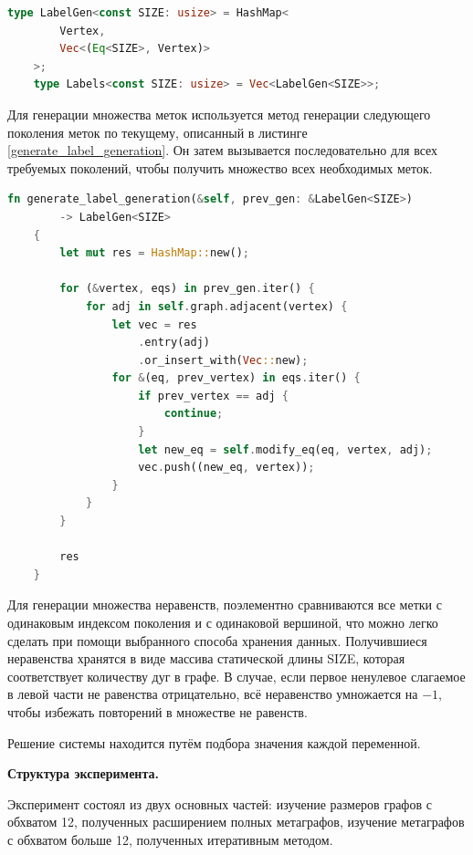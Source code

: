 \documentclass[14pt]{mmcs-article}
\begin{document}
\begin{lstlisting}[language=Rust, caption={ Метод генерации одного поколения меток. }, label=types] 
    type LabelGen<const SIZE: usize> = HashMap<
        Vertex,
        Vec<(Eq<SIZE>, Vertex)>
    >;
    type Labels<const SIZE: usize> = Vec<LabelGen<SIZE>>;
\end{lstlisting}

Для генерации множества меток используется метод генерации следующего поколения меток по текущему, описанный в листинге \ref{generate_label_generation}. Он затем вызывается последовательно для всех требуемых поколений, чтобы получить множество всех необходимых меток. 

\begin{lstlisting}[language=Rust, caption={ Метод генерации одного поколения меток. }, label=generate_label_generation]
    fn generate_label_generation(&self, prev_gen: &LabelGen<SIZE>)
        -> LabelGen<SIZE>
    {
        let mut res = HashMap::new();

        for (&vertex, eqs) in prev_gen.iter() {
            for adj in self.graph.adjacent(vertex) {
                let vec = res
                    .entry(adj)
                    .or_insert_with(Vec::new);
                for &(eq, prev_vertex) in eqs.iter() {
                    if prev_vertex == adj {
                        continue;
                    }
                    let new_eq = self.modify_eq(eq, vertex, adj);
                    vec.push((new_eq, vertex));
                }
            }
        }

        res
    }
\end{lstlisting}

Для генерации множества неравенств, поэлементно сравниваются все метки с одинаковым индексом поколения и с одинаковой вершиной, что можно легко сделать при помощи выбранного способа хранения данных. Получившиеся неравенства хранятся в виде массива статической длины SIZE, которая соответствует количеству дуг в графе. В случае, если первое ненулевое слагаемое в левой части не равенства отрицательно, всё неравенство умножается на $-1$, чтобы избежать повторений в множестве не равенств.

Решение системы находится путём подбора значения каждой переменной.

\textbf{Структура эксперимента.} 

Эксперимент состоял из двух основных частей: изучение размеров графов с обхватом 12, полученных расширением полных метаграфов, изучение метаграфов с обхватом больше 12, полученных итеративным методом.
\end{document}
